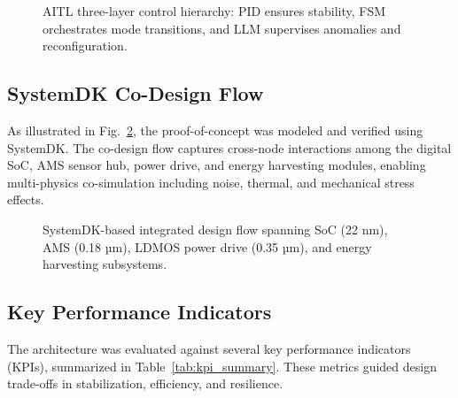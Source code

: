 \begin{figure}[t]
  \centering
  \resizebox{0.9\linewidth}{!}{}
  \caption{AITL three-layer control hierarchy:
  PID ensures stability, FSM orchestrates mode transitions,
  and LLM supervises anomalies and reconfiguration.}
  \label{fig:aitl_architecture}
\end{figure}

\subsection{SystemDK Co-Design Flow}
As illustrated in Fig.~\ref{fig:systemdk_flow}, the proof-of-concept was modeled and verified
using SystemDK. The co-design flow captures cross-node interactions among the digital SoC,
AMS sensor hub, power drive, and energy harvesting modules, enabling multi-physics
co-simulation including noise, thermal, and mechanical stress effects.

\begin{figure}[t]
  \centering
  \caption{SystemDK-based integrated design flow spanning SoC (22 nm), AMS (0.18 µm),
  LDMOS power drive (0.35 µm), and energy harvesting subsystems.}
  \label{fig:systemdk_flow}
\end{figure}

\subsection{Key Performance Indicators}
The architecture was evaluated against several key performance indicators (KPIs),
summarized in Table~\ref{tab:kpi_summary}. These metrics guided design trade-offs
in stabilization, efficiency, and resilience.

